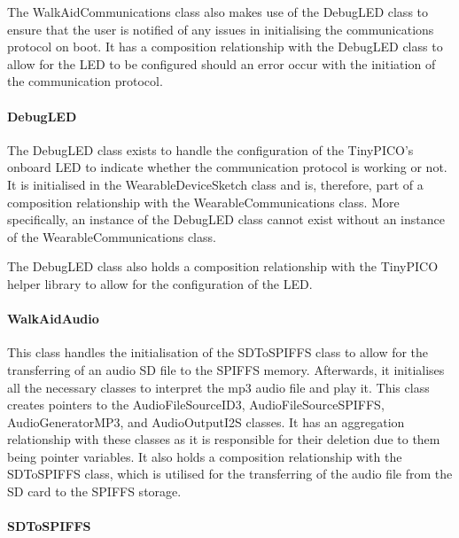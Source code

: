                             The WalkAidCommunications class also makes use of the DebugLED class to ensure that the user is notified of any issues in initialising the communications protocol on boot. It has a composition relationship with the DebugLED class to allow for the LED to be configured should an error occur with the initiation of the communication protocol.
        
                        \paragraph{DebugLED}\mbox{}
        
                            The DebugLED class exists to handle the configuration of the TinyPICO's onboard LED to indicate whether the communication protocol is working or not. It is initialised in the WearableDeviceSketch class and is, therefore, part of a composition relationship with the WearableCommunications class. More specifically, an instance of the DebugLED class cannot exist without an instance of the WearableCommunications class.
        
                            The DebugLED class also holds a composition relationship with the TinyPICO helper library to allow for the configuration of the LED.
        
                        \paragraph{WalkAidAudio}\mbox{}
        
                            This class handles the initialisation of the SDToSPIFFS class to allow for the transferring of an audio SD file to the SPIFFS memory. Afterwards, it initialises all the necessary classes to interpret the mp3 audio file and play it. This class creates pointers to the AudioFileSourceID3, AudioFileSourceSPIFFS, AudioGeneratorMP3, and AudioOutputI2S classes. It has an aggregation relationship with these classes as it is responsible for their deletion due to them being pointer variables. It also holds a composition relationship with the SDToSPIFFS class, which is utilised for the transferring of the audio file from the SD card to the SPIFFS storage. 
        
                        \paragraph{SDToSPIFFS}\mbox{}
        
